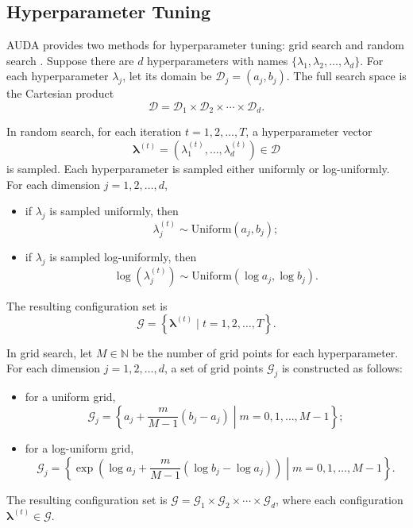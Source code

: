 \subsection{Hyperparameter Tuning}

AUDA provides two methods for hyperparameter tuning: grid search \cite{hastie2009elements} and random search \cite{bergstra2012random}. Suppose there are \(d\) hyperparameters with names \(\{ \lambda_1, \lambda_2, \dots, \lambda_d \}\). For each hyperparameter \(\lambda_j\), let its domain be \(\mathcal{D}_j = (a_j, b_j)\). The full search space is the Cartesian product
\[
	\mathcal{D} = \mathcal{D}_1 \times \mathcal{D}_2 \times \cdots \times \mathcal{D}_d .
\]

In random search, for each iteration \(t = 1, 2, \dots, T\), a hyperparameter vector
\[
	\bm{\lambda}^{(t)} = \left(\lambda_1^{(t)}, \dots, \lambda_d^{(t)}\right) \in \mathcal{D}
\]
is sampled. Each hyperparameter is sampled either uniformly or log-uniformly. For each dimension \(j = 1, 2, \dots, d\),
\begin{itemize}
	\item if \(\lambda_j\) is sampled uniformly, then
	      \[
		      \lambda_j^{(t)} \sim \mathrm{Uniform}(a_j, b_j);
	      \]
	\item if \(\lambda_j\) is sampled log-uniformly, then
	      \[
		      \log\left(\lambda_j^{(t)}\right) \sim \mathrm{Uniform}(\log a_j, \log b_j).
	      \]
\end{itemize}
The resulting configuration set is
\[
	\mathcal{G} = \left\{ \bm{\lambda}^{(t)} \mid t = 1, 2, \dots, T \right\}.
\]

In grid search, let \(M \in \mathbb{N}\) be the number of grid points for each hyperparameter. For each dimension \(j = 1, 2, \dots, d\), a set of grid points \(\mathcal{G}_j\) is constructed as follows:
\begin{itemize}
	\item for a uniform grid,
	      \[
		      \mathcal{G}_j = \left\{ a_j + \frac{m}{M - 1}(b_j - a_j) \middle| m = 0, 1, \dots, M - 1 \right\};
	      \]
	\item for a log-uniform grid,
	      \[
		      \mathcal{G}_j = \left\{ \exp \left( \log a_j + \frac{m}{M - 1}(\log b_j - \log a_j) \right) \middle| m = 0, 1, \dots, M - 1 \right\}.
	      \]
\end{itemize}
The resulting configuration set is \(\mathcal{G} = \mathcal{G}_1 \times \mathcal{G}_2 \times \cdots \times \mathcal{G}_d\), where each configuration \(\bm{\lambda}^{(t)} \in \mathcal{G}\).

